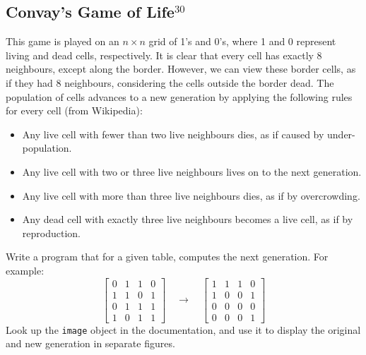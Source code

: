 \documentclass[a4paper, fleqn, 10pt]{report}
\theoremstyle{definition}
\newcommand{\mc}[1]{{\color{Blue}\tt #1}}
\begin{document}
\subsection*{Convay's Game of Life$^{30}$}
This game is played on an $n\times n$ grid of 1's and 0's,
where 1 and 0 represent living and dead cells, respectively.
It is clear that every cell has exactly 8 neighbours,
except along the border.
However, we can view these border cells, as if they had 8 neighbours,
considering the cells outside the border dead.
The population of cells advances to a new generation by
applying the following rules for every cell (from Wikipedia):
\begin{itemize}
 \item Any live cell with fewer than two live neighbours dies, as if caused by under-population.
 \item Any live cell with two or three live neighbours lives on to the next generation.
 \item Any live cell with more than three live neighbours dies, as if by overcrowding.
 \item Any dead cell with exactly three live neighbours becomes a live cell, as if by reproduction.
\end{itemize}

Write a program that for a given table, computes the next generation.
For example:
\[
\begin{bmatrix}
 0 & 1 & 1 & 0\\
 1 & 1 & 0 & 1\\
 0 & 1 & 1 & 1\\
 1 & 0 & 1 & 1
\end{bmatrix}
\quad \longrightarrow
\quad
\begin{bmatrix}
 1 & 1 & 1 & 0\\
 1 & 0 & 0 & 1\\
 0 & 0 & 0 & 0\\
 0 & 0 & 0 & 1
\end{bmatrix}
\]
Look up the \mc{image} object in the documentation, and
use it to display the original and new generation in separate figures.
\end{document}
